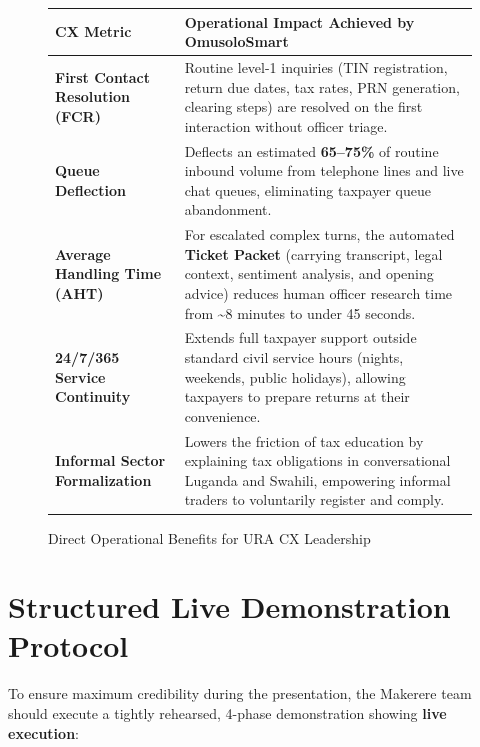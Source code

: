\documentclass[10pt,a4paper]{article}
\begin{document}
\begin{figure}[h!]
\centering
\small
\begin{tabularx}{\textwidth}{l X}
\toprule
\textbf{CX Metric} & \textbf{Operational Impact Achieved by OmusoloSmart} \\
\midrule
\textbf{First Contact Resolution (FCR)} & Routine level-1 inquiries (TIN registration, return due dates, tax rates, PRN generation, clearing steps) are resolved on the first interaction without officer triage. \\
\addlinespace
\textbf{Queue Deflection} & Deflects an estimated \textbf{65--75\%} of routine inbound volume from telephone lines and live chat queues, eliminating taxpayer queue abandonment. \\
\addlinespace
\textbf{Average Handling Time (AHT)} & For escalated complex turns, the automated \textbf{Ticket Packet} (carrying transcript, legal context, sentiment analysis, and opening advice) reduces human officer research time from \textasciitilde{}8 minutes to under 45 seconds. \\
\addlinespace
\textbf{24/7/365 Service Continuity} & Extends full taxpayer support outside standard civil service hours (nights, weekends, public holidays), allowing taxpayers to prepare returns at their convenience. \\
\addlinespace
\textbf{Informal Sector Formalization} & Lowers the friction of tax education by explaining tax obligations in conversational Luganda and Swahili, empowering informal traders to voluntarily register and comply. \\
\bottomrule
\end{tabularx}
\caption{Direct Operational Benefits for URA CX Leadership}
\end{figure}

\section{Structured Live Demonstration Protocol}

To ensure maximum credibility during the presentation, the Makerere team should execute a tightly rehearsed, 4-phase demonstration showing \textbf{live execution}:
\end{document}

